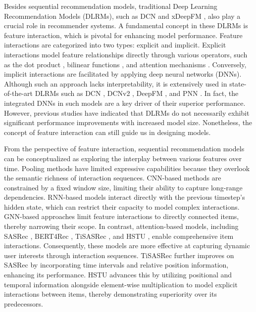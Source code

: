 Besides sequential recommendation models, traditional Deep Learning Recommendation Models (DLRMs), such as DCN \cite{dcn} and xDeepFM \cite{xdeepfm}, also play a crucial role in recommender systems. A fundamental concept in these DLRMs is feature interaction, which is pivotal for enhancing model performance. Feature interactions are categorized into two types: explicit and implicit. Explicit interactions model feature relationships directly through various operators, such as the dot product \cite{fm, dcn}, bilinear functions \cite{xdeepfm}, and attention mechanisms \cite{song2019autoint}. Conversely, implicit interactions are facilitated by applying deep neural networks (DNNs). Although such an approach lacks interpretability, it is extensively used in state-of-the-art DLRMs such as DCN \cite{dcn}, DCNv2 \cite{dcnv2}, DeepFM \cite{deepfm}, and PNN \cite{pnn}. In fact, the integrated DNNs in such models are a key driver of their superior performance. However, previous studies \cite{guo2023embedding, ardalani2022understanding} have indicated that DLRMs do not necessarily exhibit significant performance improvements with increased model size. Nonetheless, the concept of feature interaction can still guide us in designing models.

From the perspective of feature interaction, sequential recommendation models can be conceptualized as exploring the interplay between various features over time. Pooling methods \cite{covington2016deep} have limited expressive capabilities because they overlook the semantic richness of interaction sequences. CNN-based methods \cite{caser} are constrained by a fixed window size, limiting their ability to capture long-range dependencies. RNN-based models \cite{hidasi2015session} interact directly with the previous timestep's hidden state, which can restrict their capacity to model complex interactions. GNN-based approaches \cite{wu2019session} limit feature interactions to directly connected items, thereby narrowing their scope. In contrast, attention-based models, including SASRec \cite{kang2018self}, BERT4Rec \cite{bert4rec}, TiSASRec \cite{tisasrec}, and HSTU \cite{zhai2024actions}, enable comprehensive item interactions. Consequently, these models are more effective at capturing dynamic user interests through interaction sequences. TiSASRec \cite{tisasrec} further improves on SASRec by incorporating time intervals and relative position information, enhancing its performance. HSTU \cite{zhai2024actions} advances this by utilizing positional and temporal information alongside element-wise multiplication to model explicit interactions between items, thereby demonstrating superiority over its predecessors.

